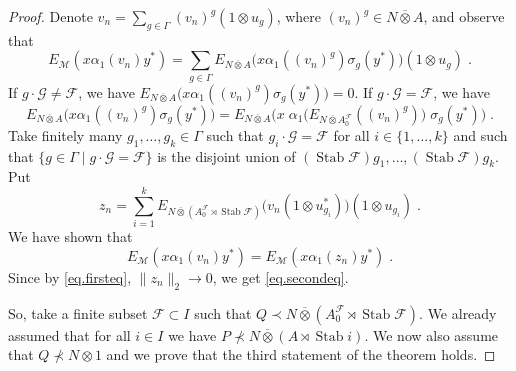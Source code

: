 \documentclass[a4paper,11pt]{amsart}
\numberwithin{equation}{section}
\begin{document}
\begin{proof}
Denote $v_n = \sum_{g \in \Gamma} (v_n)^g (1 {\otimes} u_g)$, where $(v_n)^g \in N {\mathbin{\overline{\otimes}}} A$, and observe that
$$E_{\mathcal{M}}(x {\alpha}_1(v_n) y^*) = \sum_{g \in \Gamma} E_{N {\mathbin{\overline{\otimes}}} A}\bigl( x {\alpha}_1((v_n)^g) {\sigma}_g(y^*)\bigr) (1 {\otimes} u_g) \; .$$
If $g \cdot {\mathcal{G}} \neq {\mathcal{F}}$, we have $E_{N {\mathbin{\overline{\otimes}}} A}\bigl( x {\alpha}_1((v_n)^g) {\sigma}_g(y^*)\bigr) = 0$. If $g \cdot {\mathcal{G}} = {\mathcal{F}}$, we have
$$E_{N {\mathbin{\overline{\otimes}}} A}\bigl( x {\alpha}_1((v_n)^g) {\sigma}_g(y^*)\bigr) = E_{N {\mathbin{\overline{\otimes}}} A}\bigl( x \; {\alpha}_1\bigl(E_{N {\mathbin{\overline{\otimes}}} A_0^{\mathcal{F}}}((v_n)^g)\bigr) \; {\sigma}_g(y^*) \bigr) \; .$$
Take finitely many $g_1,\ldots,g_k \in \Gamma$ such that $g_i \cdot {\mathcal{G}} = {\mathcal{F}}$ for all $i \in \{1,\ldots,k\}$ and such that $\{g \in \Gamma \mid g \cdot {\mathcal{G}} = {\mathcal{F}}\}$ is the disjoint union of $({\operatorname{Stab}} {\mathcal{F}}) g_1,\ldots,({\operatorname{Stab}} {\mathcal{F}}) g_k$. Put
$$z_n = \sum_{i=1}^k E_{N {\mathbin{\overline{\otimes}}} (A_0^{\mathcal{F}} \rtimes {\operatorname{Stab}} {\mathcal{F}})}\bigl( v_n (1 {\otimes} u_{g_i}^*)\bigr) (1 {\otimes} u_{g_i}) \; .$$
We have shown that
$$E_{\mathcal{M}}(x {\alpha}_1(v_n) y^*) = E_{\mathcal{M}} (x {\alpha}_1(z_n) y^*) \; .$$
Since by \eqref{eq.firsteq}, $\|z_n\|_2 {\rightarrow} 0$, we get \eqref{eq.secondeq}.

So, take a finite subset ${\mathcal{F}} \subset I$ such that $Q {\prec} N {\mathbin{\overline{\otimes}}} (A_0^{\mathcal{F}} \rtimes {\operatorname{Stab}} {\mathcal{F}})$. We already assumed that for all $i \in I$ we have $P \not\prec N {\mathbin{\overline{\otimes}}} (A \rtimes {\operatorname{Stab}} i)$. We now also assume that $Q \not\prec N {\otimes} 1$ and we prove that the third statement of the theorem holds.


\end{proof}
\end{document}
